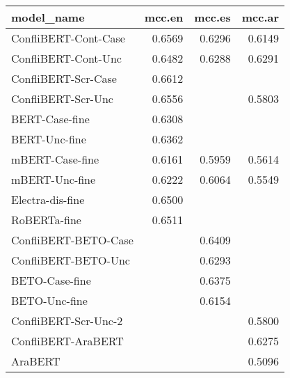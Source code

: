 \begin{table}[ht]
\centering
\begin{tabular}{lrrr}
  \hline
model\_name & mcc.en & mcc.es & mcc.ar \\ 
  \hline
ConfliBERT-Cont-Case & 0.6569 & 0.6296 & 0.6149 \\ 
ConfliBERT-Cont-Unc & 0.6482 & 0.6288 & 0.6291 \\ 
ConfliBERT-Scr-Case & 0.6612 &  &  \\ 
ConfliBERT-Scr-Unc & 0.6556 &  & 0.5803 \\ 
BERT-Case-fine & 0.6308 &  &  \\ 
BERT-Unc-fine & 0.6362 &  &  \\ 
mBERT-Case-fine & 0.6161 & 0.5959 & 0.5614 \\ 
mBERT-Unc-fine & 0.6222 & 0.6064 & 0.5549 \\ 
Electra-dis-fine & 0.6500 &  &  \\ 
RoBERTa-fine & 0.6511 &  &  \\ 
ConfliBERT-BETO-Case &  & 0.6409 &  \\ 
ConfliBERT-BETO-Unc &  & 0.6293 &  \\ 
BETO-Case-fine &  & 0.6375 &  \\ 
BETO-Unc-fine &  & 0.6154 &  \\ 
ConfliBERT-Scr-Unc-2 &  &  & 0.5800 \\ 
ConfliBERT-AraBERT &  &  & 0.6275 \\ 
AraBERT &  &  & 0.5096 \\ 
   \hline
\end{tabular}
\end{table}
